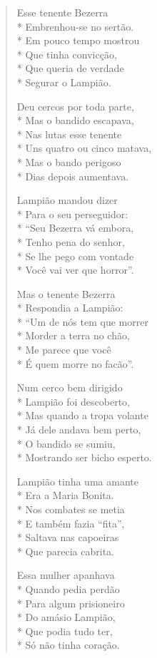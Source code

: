 \begin{verse}
Esse tenente Bezerra\\*
Embrenhou-se no sertão.\\*
Em pouco tempo mostrou\\*
Que tinha convicção,\\*
Que queria de verdade\\*
Segurar o Lampião.

Deu cercos por toda parte,\\*
Mas o bandido escapava,\\*
Nas lutas esse tenente\\*
Uns quatro ou cinco matava,\\*
Mas o bando perigoso\\*
Dias depois aumentava.

Lampião mandou dizer\\*
Para o seu perseguidor:\\*
“Seu Bezerra vá embora,\\*
Tenho pena do senhor,\\*
Se lhe pego com vontade\\*
Você vai ver que horror”.

Mas o tenente Bezerra\\*
Respondia a Lampião:\\*
“Um de nós tem que morrer\\*
Morder a terra no chão,\\*
Me parece que você\\*
É quem morre no facão”.

Num cerco bem dirigido\\*
Lampião foi descoberto,\\*
Mas quando a tropa volante\\*
Já dele andava bem perto,\\*
O bandido se sumiu,\\*
Mostrando ser bicho esperto.

Lampião tinha uma amante\\*
Era a Maria Bonita.\\*
Nos combates se metia\\*
E também fazia “fita”,\\*
Saltava nas capoeiras\\*
Que parecia cabrita.

Essa mulher apanhava\\*
Quando pedia perdão\\*
Para algum prisioneiro\\*
Do amásio Lampião,\\*
Que podia tudo ter,\\*
Só não tinha coração.


\end{verse}
